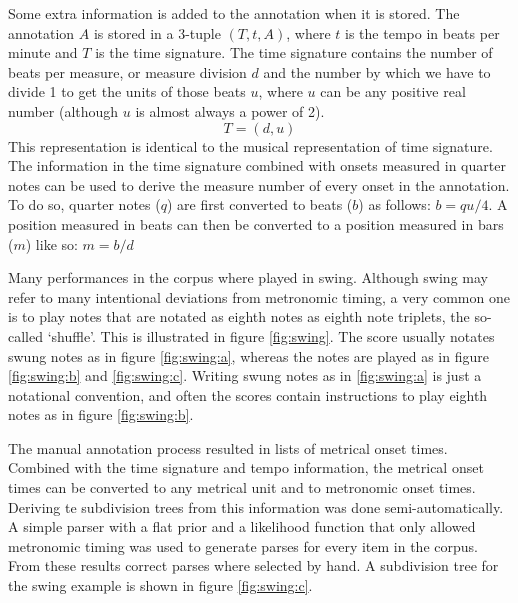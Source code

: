 Some extra information is added to the annotation when it is stored. The annotation $A$ is stored in a 3-tuple $(T, t, A)$, where $t$ is the tempo in beats per minute and $T$ is the time signature. The time signature contains the number of beats per measure, or measure division $d$ and the number by which we have to divide 1 to get the units of those beats $u$, where $u$ can be any positive real number (although $u$ is almost always a power of 2). 
\begin{equation*}
T = (d, u)
\end{equation*}
This representation is identical to the musical representation of time signature. The information in the time signature combined with onsets measured in quarter notes can be used to derive the measure number of every onset in the annotation. To do so, quarter notes ($q$) are first converted to beats ($b$) as follows: $b = qu/4$. A position measured in beats can then be converted to a position measured in bars ($m$) like so: $m = b/d$

Many performances in the corpus where played in swing. Although swing may refer to many intentional deviations from metronomic timing, a very common one is to play notes that are notated as eighth notes as eighth note triplets, the so-called `shuffle'. This is illustrated in figure \ref{fig:swing}. The score usually notates swung notes as in figure \ref{fig:swing:a}, whereas the notes are played as in figure \ref{fig:swing:b} and \ref{fig:swing:c}. Writing swung notes as in \ref{fig:swing:a} is just a notational convention, and often the scores contain instructions to play eighth notes as in figure \ref{fig:swing:b}.

The manual annotation process resulted in lists of metrical onset times. Combined with the time signature and tempo information, the metrical onset times can be converted to any metrical unit and to metronomic onset times. Deriving te subdivision trees from this information was done semi-automatically. A simple parser with a flat prior and a likelihood function that only allowed metronomic timing was used to generate parses for every item in the corpus. From these results correct parses where selected by hand. A subdivision tree for the swing example is shown in figure \ref{fig:swing:c}. 


